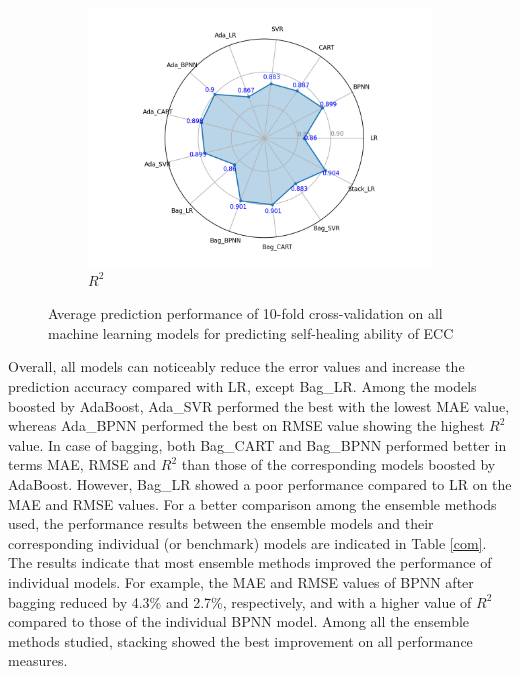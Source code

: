 \documentclass[11pt]{article}
\begin{document}
\begin{figure}[!h]
\begin{subfigure}{.53\textwidth}
			\includegraphics[width = \linewidth]{R2circle.png}
			\caption{$R^2$}
		\end{subfigure}%
		\hspace{1em}
		\caption{Average prediction performance of 10-fold cross-validation on all machine learning models for predicting self-healing ability of ECC }\label{comp}
	\end{figure}
	

	Overall, all models can noticeably reduce the error values and increase the prediction accuracy compared with LR, except Bag\_LR. Among the models boosted by AdaBoost, Ada\_SVR performed the best with the lowest MAE value, whereas Ada\_BPNN performed the best on RMSE value showing the highest $R^2$ value. In case of bagging, both Bag\_CART and Bag\_BPNN performed better in terms MAE, RMSE and $R^2$ than those of the corresponding models boosted by AdaBoost. However, Bag\_LR showed a poor performance compared to LR on the MAE and RMSE values. For a better comparison among the ensemble methods used, the performance results between the ensemble models and their corresponding individual (or benchmark) models are indicated in Table \ref{com}. The results indicate that most ensemble methods improved the performance of individual models. For example, the MAE and RMSE values of BPNN after bagging reduced by 4.3\% and 2.7\%, respectively, and with a higher value of $R^2$ compared to those of the individual BPNN model. Among all the ensemble methods studied, stacking showed the best improvement on all performance measures.
	
\end{document}
